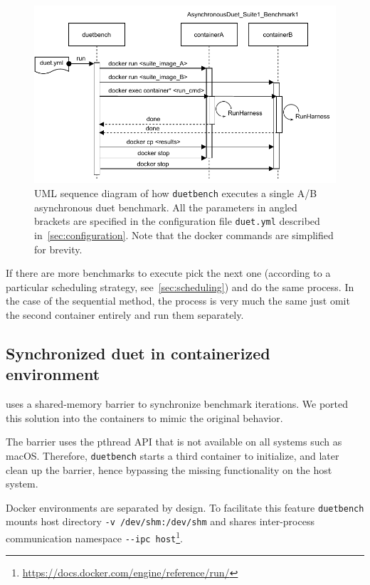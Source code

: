 \begin{figure}
    \centering
    \includegraphics[width=\linewidth]{./figures/duetbench-sequence.drawio.pdf}
    \caption{
        UML sequence diagram of how \lstinline{duetbench} executes a single A/B asynchronous duet benchmark.
        All the parameters in angled brackets are specified in the configuration file \lstinline{duet.yml} described in~\cref{sec:configuration}.
        Note that the docker commands are simplified for brevity.
    }
    \label{fig:duetbench_sequence}
\end{figure}

If there are more benchmarks to execute pick the next one (according to a particular scheduling strategy, see~\cref{sec:scheduling}) and do the same process.
In the case of the sequential method, the process is very much the same just omit the second container entirely and run them separately.

\subsection{Synchronized duet in containerized environment}
\label{sec:sync_duet_impl}

\citet{bulej2020duet} uses a \mbox{shared-memory} barrier to synchronize benchmark iterations.
We ported this solution into the containers to mimic the original behavior.

The barrier uses the pthread API that is not available on all systems such as macOS.
Therefore, \lstinline{duetbench} starts a third container to initialize, and later clean up the barrier, hence bypassing the missing functionality on the host system.

Docker environments are separated by design.
To facilitate this feature \lstinline{duetbench} mounts host directory \lstinline{-v /dev/shm:/dev/shm} and shares \mbox{inter-process} communication namespace \lstinline{--ipc host}\footnote{\url{https://docs.docker.com/engine/reference/run/}}.

